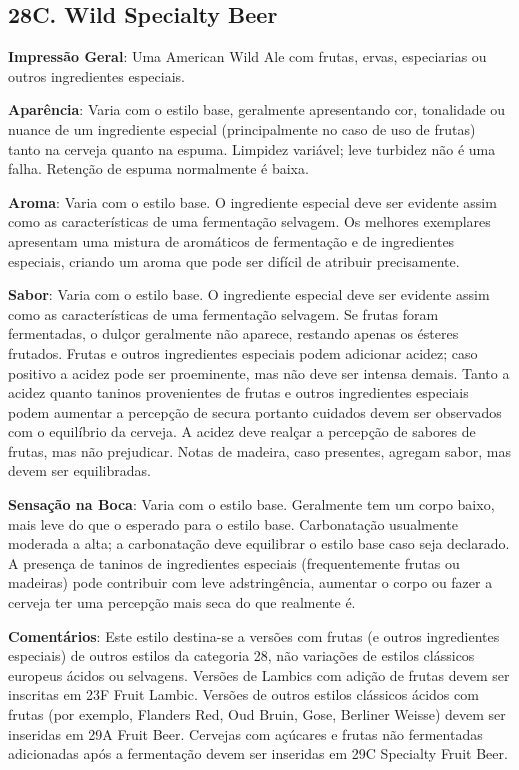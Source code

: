 \subsection*{28C. Wild Specialty Beer}

\textbf{Impressão Geral}: Uma American Wild Ale com frutas, ervas, especiarias ou outros ingredientes especiais.

\textbf{Aparência}: Varia com o estilo base, geralmente apresentando cor, tonalidade ou nuance de um ingrediente especial (principalmente no caso de uso de frutas) tanto na cerveja quanto na espuma. Limpidez variável; leve turbidez não é uma falha. Retenção de espuma normalmente é baixa.

\textbf{Aroma}: Varia com o estilo base. O ingrediente especial deve ser evidente assim como as características de uma fermentação selvagem. Os melhores exemplares apresentam uma mistura de aromáticos de fermentação e de ingredientes especiais, criando um aroma que pode ser difícil de atribuir precisamente.

\textbf{Sabor}: Varia com o estilo base. O ingrediente especial deve ser evidente assim como as características de uma fermentação selvagem. Se frutas foram fermentadas, o dulçor geralmente não aparece, restando apenas os ésteres frutados. Frutas e outros ingredientes especiais podem adicionar acidez; caso positivo a acidez pode ser proeminente, mas não deve ser intensa demais. Tanto a acidez quanto taninos provenientes de frutas e outros ingredientes especiais podem aumentar a percepção de secura portanto cuidados devem ser observados com o equilíbrio da cerveja. A acidez deve realçar a percepção de sabores de frutas, mas não prejudicar. Notas de madeira, caso presentes, agregam sabor, mas devem ser equilibradas.

\textbf{Sensação na Boca}: Varia com o estilo base. Geralmente tem um corpo baixo, mais leve do que o esperado para o estilo base. Carbonatação usualmente moderada a alta; a carbonatação deve equilibrar o estilo base caso seja declarado. A presença de taninos de ingredientes especiais (frequentemente frutas ou madeiras) pode contribuir com leve adstringência, aumentar o corpo ou fazer a cerveja ter uma percepção mais seca do que realmente é.

\textbf{Comentários}: Este estilo destina-se a versões com frutas (e outros ingredientes especiais) de outros estilos da categoria 28, não variações de estilos clássicos europeus ácidos ou selvagens. Versões de Lambics com adição de frutas devem ser inscritas em 23F Fruit Lambic. Versões de outros estilos clássicos ácidos com frutas (por exemplo, Flanders Red, Oud Bruin, Gose, Berliner Weisse) devem ser inseridas em 29A Fruit Beer. Cervejas com açúcares e frutas não fermentadas adicionadas após a fermentação devem ser inseridas em 29C Specialty Fruit Beer.

